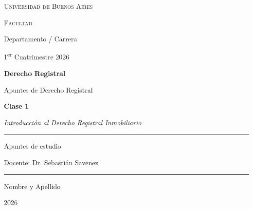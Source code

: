 \documentclass[12pt,oneside]{book}
\newcommand{\universidad}{Universidad de Buenos Aires}
\newcommand{\facultad}{Facultad}
\newcommand{\departamento}{Departamento / Carrera}
\newcommand{\materia}{Derecho Registral}
\newcommand{\titulo}{Apuntes de \materia}
\newcommand{\autor}{Nombre y Apellido}
\newcommand{\anio}{2026}
\newcommand{\docente}{Dr. Sebasti\'an Savenez}
\newcommand{\cuatrimestre}{1\textsuperscript{er} Cuatrimestre 2026}
\newcommand{\clasetitulo}{Clase 1}
\newcommand{\clasesubtitulo}{Introducci\'on al Derecho Registral Inmobiliario}
\begin{document}

\begin{titlepage}

\thispagestyle{empty}

\begin{center}

\vspace*{1cm}

\vspace{1cm}

{\large \textsc{\universidad}}

\vspace{0.2cm}

{\large \textsc{\facultad}}

\vspace{0.2cm}

{\large \departamento}

\vspace{0.5cm}

{\normalsize \cuatrimestre}

\vspace{2.5cm}

{\Huge \textbf{\materia}}

\vspace{1cm}

{\LARGE \titulo}

\vspace{0.8cm}

{\large \textbf{\clasetitulo}}

\vspace{0.3cm}

{\large \textit{\clasesubtitulo}}

\vspace{1.5cm}

\rule{0.70\textwidth}{0.5pt}

\vspace{0.5cm}

{\large Apuntes de estudio}

\vspace{0.3cm}

{\large Docente: \docente}

\vspace{0.5cm}

\rule{0.70\textwidth}{0.5pt}

\vfill

{\large \autor}

\vspace{0.3cm}

{\large \anio}

\end{center}

\end{titlepage}
\end{document}

